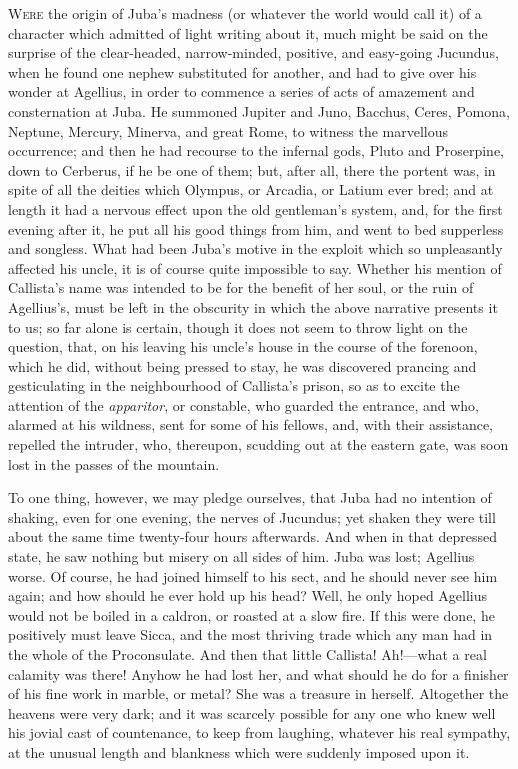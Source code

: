 W\textsc{ere} the origin of Juba's madness (or whatever the world
would call it) of a character which admitted of light writing about
it, much might be said on the surprise of the clear-headed,
narrow-minded, positive, and easy-going Jucundus, when he found one
nephew substituted for another, and had to give over his wonder at
Agellius, in order to commence a series of acts of amazement and
consternation at Juba. He summoned Jupiter and Juno, Bacchus, Ceres,
Pomona, Neptune, Mercury, Minerva, and great Rome, to witness the
marvellous occurrence; and then he had recourse to the infernal gods,
Pluto and Proserpine, down to Cerberus, if he be one of them; but,
after all, there the portent was, in spite of all the deities which
Olympus, or Arcadia, or Latium ever bred; and at length it had a
nervous effect upon the old gentleman's system, and, for the first
evening after it, he put all his good things from him, and went to bed
supperless and songless. What had been Juba's motive in the exploit
which so unpleasantly affected his uncle, it is of course quite
impossible to say. Whether his mention of Callista's name was intended
to be for the benefit of her soul, or the ruin of Agellius's,
must be left in the obscurity in which the above narrative presents it
to us; so far alone is certain, though it does not seem to throw light
on the question, that, on his leaving his uncle's house in the course
of the forenoon, which he did, without being pressed to stay, he was
discovered prancing and gesticulating in the neighbourhood of Callista's
prison, so as to excite the attention of the \emph{apparitor}, or
constable, who guarded the entrance, and who, alarmed at his wildness,
sent for some of his fellows, and, with their assistance, repelled the
intruder, who, thereupon, scudding out at the eastern gate, was soon
lost in the passes of the mountain.

To one thing, however, we may pledge ourselves, that Juba had no
intention of shaking, even for one evening, the nerves of Jucundus;
yet shaken they were till about the same time twenty-four hours
afterwards. And when in that depressed state, he saw nothing but
misery on all sides of him. Juba was lost; Agellius worse. Of course,
he had joined himself to his sect, and he should never see him again;
and how should he ever hold up his head? Well, he only hoped Agellius
would not be boiled in a caldron, or roasted at a slow fire. If this
were done, he positively must leave Sicca, and the most thriving trade
which any man had in the whole of the Proconsulate. And then that
little Callista! Ah!—what a real calamity was there! Anyhow he had
lost her, and what should he do for a finisher of his fine work in
marble, or metal? She was a treasure in herself. Altogether the
heavens were very dark; and it was scarcely possible for any one who
knew well his jovial cast of countenance, to keep from laughing,
whatever his real sympathy, at the unusual length and blankness which
were suddenly imposed upon it.

